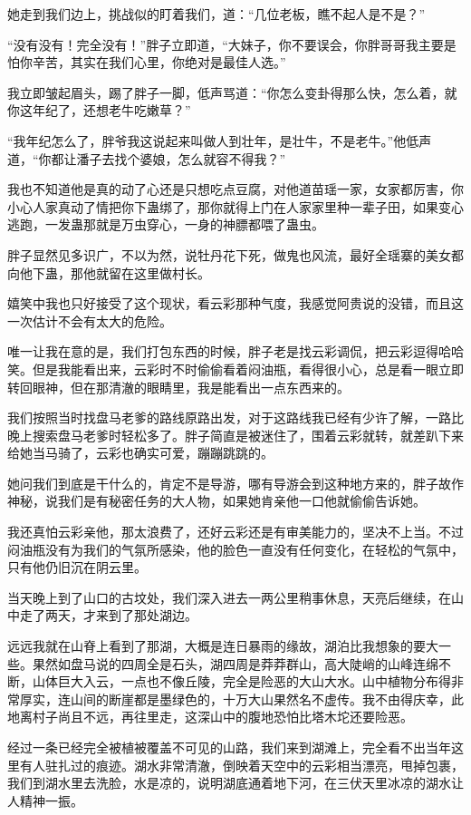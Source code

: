 她走到我们边上，挑战似的盯着我们，道：“几位老板，瞧不起人是不是？”

“没有没有！完全没有！”胖子立即道，“大妹子，你不要误会，你胖哥哥我主要是怕你辛苦，其实在我们心里，你绝对是最佳人选。”

我立即皱起眉头，踢了胖子一脚，低声骂道：“你怎么变卦得那么快，怎么着，就你这年纪了，还想老牛吃嫩草？”

“我年纪怎么了，胖爷我这说起来叫做人到壮年，是壮牛，不是老牛。”他低声道，“你都让潘子去找个婆娘，怎么就容不得我？”

我也不知道他是真的动了心还是只想吃点豆腐，对他道苗瑶一家，女家都厉害，你小心人家真动了情把你下蛊绑了，那你就得上门在人家家里种一辈子田，如果变心逃跑，一发蛊那就是万虫穿心，一身的神膘都喂了蛊虫。

胖子显然见多识广，不以为然，说牡丹花下死，做鬼也风流，最好全瑶寨的美女都向他下蛊，那他就留在这里做村长。

嬉笑中我也只好接受了这个现状，看云彩那种气度，我感觉阿贵说的没错，而且这一次估计不会有太大的危险。

唯一让我在意的是，我们打包东西的时候，胖子老是找云彩调侃，把云彩逗得哈哈笑。但是我能看出来，云彩时不时偷偷看着闷油瓶，看得很小心，总是看一眼立即转回眼神，但在那清澈的眼睛里，我是能看出一点东西来的。

我们按照当时找盘马老爹的路线原路出发，对于这路线我已经有少许了解，一路比晚上搜索盘马老爹时轻松多了。胖子简直是被迷住了，围着云彩就转，就差趴下来给她当马骑了，云彩也确实可爱，蹦蹦跳跳的。

她问我们到底是干什么的，肯定不是导游，哪有导游会到这种地方来的，胖子故作神秘，说我们是有秘密任务的大人物，如果她肯亲他一口他就偷偷告诉她。

我还真怕云彩亲他，那太浪费了，还好云彩还是有审美能力的，坚决不上当。不过闷油瓶没有为我们的气氛所感染，他的脸色一直没有任何变化，在轻松的气氛中，只有他仍旧沉在阴云里。

当天晚上到了山口的古坟处，我们深入进去一两公里稍事休息，天亮后继续，在山中走了两天，才来到了那处湖边。

远远我就在山脊上看到了那湖，大概是连日暴雨的缘故，湖泊比我想象的要大一些。果然如盘马说的四周全是石头，湖四周是莽莽群山，高大陡峭的山峰连绵不断，山体巨大入云，一点也不像丘陵，完全是险恶的大山大水。山中植物分布得非常厚实，连山间的断崖都是墨绿色的，十万大山果然名不虚传。我不由得庆幸，此地离村子尚且不远，再往里走，这深山中的腹地恐怕比塔木坨还要险恶。

经过一条已经完全被植被覆盖不可见的山路，我们来到湖滩上，完全看不出当年这里有人驻扎过的痕迹。湖水非常清澈，倒映着天空中的云彩相当漂亮，甩掉包裹，我们到湖水里去洗脸，水是凉的，说明湖底通着地下河，在三伏天里冰凉的湖水让人精神一振。

